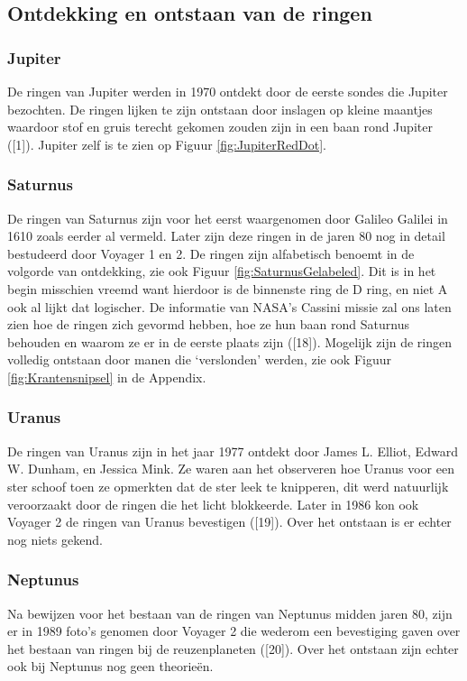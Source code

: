 \documentclass[a4paper]{article}
\begin{document}
	\subsection{Ontdekking en ontstaan van de ringen}
		\subsubsection{Jupiter}
		De ringen van Jupiter werden in 1970 ontdekt door de eerste sondes die Jupiter bezochten.
		De ringen lijken te zijn ontstaan door inslagen op kleine maantjes waardoor stof en gruis terecht gekomen zouden zijn in een baan rond Jupiter ([1]). Jupiter zelf is te zien op Figuur \ref{fig:JupiterRedDot}.
		\subsubsection{Saturnus}
		De ringen van Saturnus zijn voor het eerst waargenomen door Galileo Galilei in 1610 zoals eerder al vermeld. Later zijn deze ringen
		in de jaren 80 nog in detail bestudeerd door Voyager 1 en 2. De ringen zijn alfabetisch benoemt in de volgorde van ontdekking, zie ook Figuur \ref{fig:SaturnusGelabeled}. Dit is in het
		begin misschien vreemd want hierdoor is de binnenste ring de D ring, en niet A ook al lijkt dat logischer. De informatie van NASA's Cassini missie
		zal ons laten zien hoe de ringen zich gevormd hebben, hoe ze hun baan rond Saturnus behouden en waarom ze er in de eerste plaats zijn ([18]). Mogelijk zijn de ringen volledig ontstaan door manen die `verslonden' werden,
		zie ook Figuur \ref{fig:Krantensnipsel} in de Appendix.
		\subsubsection{Uranus}
		De ringen van Uranus zijn in het jaar 1977 ontdekt door James L. Elliot, Edward W. Dunham, en Jessica Mink. Ze waren aan het observeren hoe Uranus
		voor een ster schoof toen ze opmerkten dat de ster leek te knipperen, dit werd natuurlijk veroorzaakt door 
		de ringen die het licht blokkeerde. Later in 1986 kon ook Voyager 2 de ringen van Uranus bevestigen ([19]).
		Over het ontstaan is er echter nog niets gekend.
		\subsubsection{Neptunus}
		Na bewijzen voor het bestaan van de ringen van Neptunus midden jaren 80, zijn er in 1989
		foto's genomen door Voyager 2 die wederom een bevestiging gaven over het bestaan van ringen bij de reuzenplaneten ([20]).
		Over het ontstaan zijn echter ook bij Neptunus nog geen theorie\"en.
\end{document}
